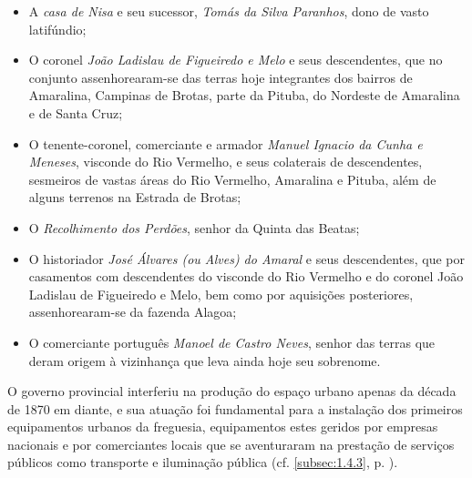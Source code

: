 \begin{itemize}
\item A \textit{casa de Nisa} e seu sucessor, \textit{Tomás da Silva Paranhos}, dono de vasto latifúndio;
\item O coronel \textit{João Ladislau de Figueiredo e Melo} e seus descendentes, que no conjunto assenhorearam-se das terras hoje integrantes dos bairros de Amaralina, Campinas de Brotas, parte da Pituba, do Nordeste de Amaralina e de Santa Cruz; 
\item O tenente-coronel, comerciante e armador \textit{Manuel Ignacio da Cunha e Meneses}, visconde do Rio Vermelho, e seus colaterais de descendentes, sesmeiros de vastas áreas do Rio Vermelho, Amaralina e Pituba, além de alguns terrenos na Estrada de Brotas;
\item O \textit{Recolhimento dos Perdões}, senhor da Quinta das Beatas;
\item O historiador \textit{José Álvares (ou Alves) do Amaral} e seus descendentes, que por casamentos com descendentes do visconde do Rio Vermelho e do coronel João Ladislau de Figueiredo e Melo, bem como por aquisições posteriores, assenhorearam-se da fazenda Alagoa;
\item O comerciante português \textit{Manoel de Castro Neves}, senhor das terras que deram origem à vizinhança que leva ainda hoje seu sobrenome.
\end{itemize}

O governo provincial interferiu na produção do espaço urbano apenas da década de 1870 em diante, e sua atuação foi fundamental para a instalação dos primeiros equipamentos urbanos da freguesia, equipamentos estes geridos por empresas nacionais e por comerciantes locais que se aventuraram na prestação de serviços públicos como transporte e iluminação pública (cf. \autoref{subsec:1.4.3}, p. \pageref{subsec:1.4.3}).